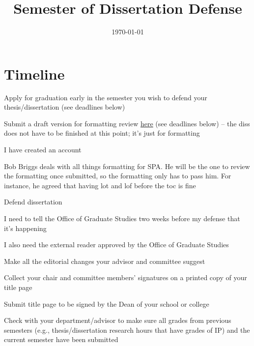 

\title{Semester of Dissertation Defense}

\date{\today}



\maketitle



\section*{Timeline}
	\begin{coi}
		\item Apply for graduation early in the semester you wish to defend your thesis/dissertation (see deadlines below)
		\item Submit a draft version for formatting review \href{http://www.etdadmin.com/american}{here} (see deadlines below) -- the diss does not have to be finished at this point; it's just for formatting
			\begin{coi}
				\item I have created an account
				\item Bob Briggs deals with all things formatting for SPA. He will be the one to review the formatting once submitted, so the formatting only has to pass him. For instance, he agreed that having lot and lof before the toc is fine 
			\end{coi}
		\item Defend dissertation
			\begin{coi}
				\item I need to tell the Office of Graduate Studies two weeks before my defense that it's happening
				\item I also need the external reader approved by the Office of Graduate Studies
			\end{coi}
		\item Make all the editorial changes your advisor and committee suggest
		\item Collect your chair and committee members' signatures on a printed copy of your title page
		\item Submit title page to be signed by the Dean of your school or college
		\item Check with your department/advisor to make sure all grades from previous semesters (e.g., thesis/dissertation research hours that have grades of IP) and the current semester have been submitted

\end{coi}
